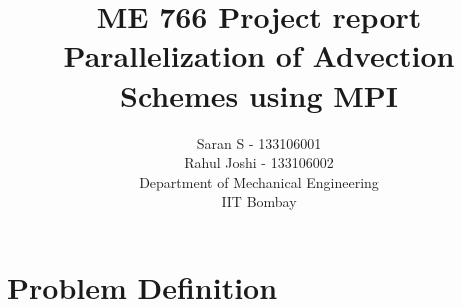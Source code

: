 \documentclass{report}
\author{Saran S - 133106001 \\ Rahul Joshi - 133106002 \\ Department of Mechanical Engineering \\ IIT Bombay}
\title{ME 766 Project report \\ Parallelization of Advection Schemes using MPI}
\begin{document}
\maketitle
\tableofcontents

\chapter{Problem Definition}
\end{document}
